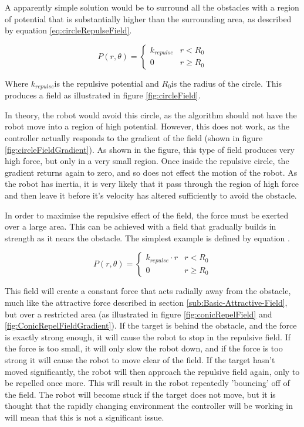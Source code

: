 \documentclass[10pt]{article}
\begin{document}
A apparently simple solution would be to surround all the obstacles with a region of potential that is substantially higher than the surrounding area, as described by equation \ref{eq:circleRepulseField}.

\begin{equation}
P\left(r,\theta\right)=\begin{cases}
k_{repulse} & r<R_{0}\\
0 & r\geq R_{0}
\end{cases}\label{eq:circleRepulseField}
\end{equation}

Where $k_{repulse}$is the repulsive potential and $R_{0}$is the radius of the circle. This produces a field as illustrated in figure \ref{fig:circleField}.

In theory, the robot would avoid this circle, as the algorithm should not have the robot move into a region of high potential. However, this does not work, as the controller actually responds to the gradient of the field (shown in figure \ref{fig:circleFieldGradient}). As shown in the figure, this type of field produces very high force, but only in a very small region. Once inside the repulsive circle, the gradient returns again to zero, and so does not effect the motion of the robot. As the robot has inertia, it is very likely that it pass through the region of high force and then leave it before it's velocity has altered sufficiently to avoid the obstacle.

In order to maximise the repulsive effect of the field, the force must be exerted over a large area. This can be achieved with a field that gradually builds in strength as it nears the obstacle. The simplest example is defined by equation .

\[
P\left(r,\theta\right)=\begin{cases}
k_{repulse}\cdot r & r<R_{0}\\
0 & r\geq R_{0}
\end{cases}
\]

This field will create a constant force that acts radially away from the obstacle, much like the attractive force described in section \ref{sub:Basic-Attractive-Field}, but over a restricted area (as illustrated in figure \ref{fig:conicRepelField} and \ref{fig:ConicRepelFieldGradient}). If the target is behind the obstacle, and the force is exactly strong enough, it will cause the robot to stop in the repulsive field. If the force is too small, it will only slow the robot down, and if the force is too strong it will cause the robot to move clear of the field. If the target hasn't moved significantly, the robot will then approach the repulsive field again, only to be repelled once more. This will result in the robot repeatedly 'bouncing' off of the field. The robot will become stuck if the target does not move, but it is thought that the rapidly changing environment the controller will be working in will mean that this is not a significant issue.
\end{document}
